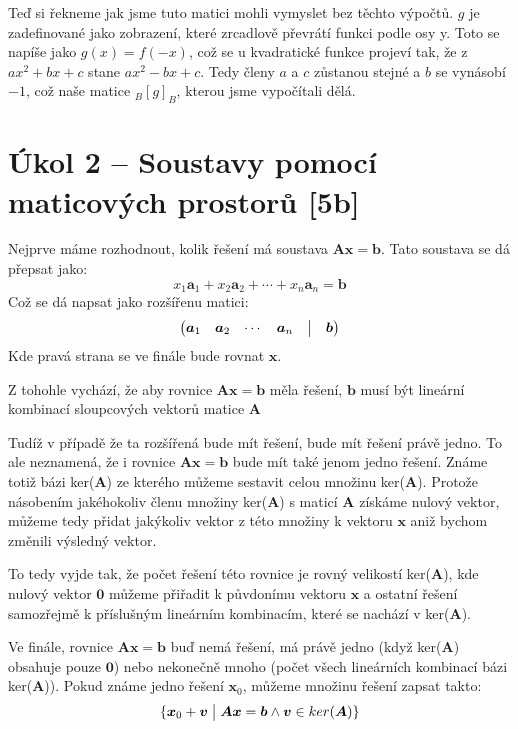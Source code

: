 \documentclass{../../../ksp}
\begin{document}
Teď si řekneme jak jsme tuto matici mohli vymyslet bez těchto výpočtů.
$g$ je zadefinované jako zobrazení, které zrcadlově převrátí funkci podle osy y.
Toto se napíše jako $g(x) = f(-x)$, což se u kvadratické funkce projeví tak, že z
$ax^2 + bx + c$ stane $ax^2 - bx + c$.
Tedy členy $a$ a $c$ zůstanou stejné a $b$ se vynásobí $-1$, což naše matice $_B[g]_B$,
kterou jsme vypočítali dělá.


\section*{Úkol 2 – Soustavy pomocí maticových prostorů [5b]}

Nejprve máme rozhodnout, kolik řešení má soustava $\bm{Ax}=\bm{b}$.
Tato soustava se dá přepsat jako:
\begin{equation}
    x_1\bm{a}_1 + x_2\bm{a}_2 + \cdots + x_n\bm{a}_n = \bm{b}
\end{equation}
Což se dá napsat jako rozšířenu matici:
\begin{equation}
    \begin{pmatrix}
        \bm{a}_1 & \bm{a}_2 & \cdots & \bm{a}_n & \bigm| & \bm{b}
    \end{pmatrix}
\end{equation}
Kde pravá strana se ve finále bude rovnat $\bm{x}$.

Z tohohle vychází, že aby rovnice $\bm{Ax}=\bm{b}$ měla řešení,
$\bm{b}$ musí být lineární kombinací sloupcových vektorů matice $\bm{A}$

Tudíž v případě že ta rozšířená bude mít řešení, bude mít řešení právě jedno.
To ale neznamená, že i rovnice $\bm{Ax}=\bm{b}$ bude mít také jenom jedno řešení.
Známe totiž bázi ker($\bm{A}$) ze kterého můžeme sestavit celou množinu ker($\bm{A}$).
Protože násobením jakéhokoliv členu množiny ker($\bm{A}$) s maticí $\bm{A}$ získáme nulový vektor,
můžeme tedy přidat jakýkoliv vektor z této množiny k vektoru $\bm{x}$ aniž bychom změnili výsledný vektor.

To tedy vyjde tak, že počet řešení této rovnice je rovný velikostí ker($\bm{A}$), kde nulový vektor $\bm{0}$
můžeme přiřadit k půvdonímu vektoru $\bm{x}$ a ostatní řešení samozřejmě k příslušným lineárním kombinacím, které se nachází v
ker($\bm{A}$).

Ve finále, rovnice $\bm{Ax}=\bm{b}$ buď nemá řešení, má právě jedno (když ker($\bm{A}$) obsahuje pouze $\bm{0}$)
nebo nekonečně mnoho (počet všech lineárních kombinací bázi ker($\bm{A}$)).
Pokud známe jedno řešení $\bm{x}_0$, můžeme množinu řešení zapsat takto:
\begin{equation}
    \{ \bm{x}_0 + \bm{v} \bigm| \bm{Ax} = \bm{b} \land \bm{v} \in ker(\bm{A}) \}
\end{equation}
\end{document}
